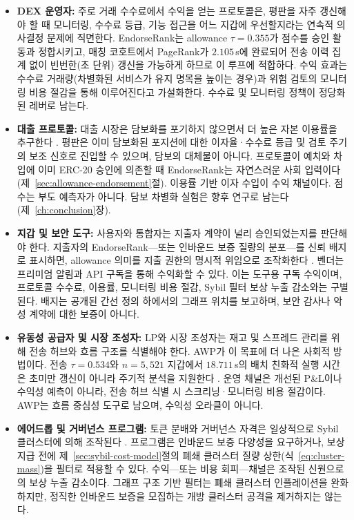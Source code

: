 \begin{itemize}
\item \textbf{DEX 운영자:} 주로 거래 수수료에서 수익을 얻는 프로토콜은, 평판을 자주 갱신해야 할 때 모니터링, 수수료 등급, 기능 접근을 어느 지갑에 우선할지라는 연속적 의사결정 문제에 직면한다. EndorseRank는 allowance $\tau=0.355$가 점수를 승인 활동과 정합시키고, 매칭 코호트에서 PageRank가 $2.105$\,s에 완료되어 전송 이력 집계 없이 빈번한(초 단위) 갱신을 가능하게 하므로 이 루프에 적합하다. 수익 효과는 수수료 거래량(차별화된 서비스가 유지 명목을 높이는 경우)과 위험 검토의 모니터링 비용 절감을 통해 이루어진다고 가설화한다. 수수료 및 모니터링 정책이 정당화된 레버로 남는다.

\item \textbf{대출 프로토콜:} 대출 시장은 담보화를 포기하지 않으면서 더 높은 자본 이용률을 추구한다 . 평판은 이미 담보화된 포지션에 대한 이자율·수수료 등급 및 검토 주기의 보조 신호로 진입할 수 있으며, 담보의 대체물이 아니다. 프로토콜이 예치와 차입에 이미 ERC-20 승인에 의존할 때 EndorseRank는 자연스러운 사회 입력이다(제~\ref{sec:allowance-endorsement}절). 이용률 기반 이자 수입이 수익 채널이다. 점수는 부도 예측자가 아니다. 담보 차별화 실험은 향후 연구로 남는다(제~\ref{ch:conclusion}장).

\item \textbf{지갑 및 보안 도구:} 사용자와 통합자는 지출자 계약이 널리 승인되었는지를 판단해야 한다. 지출자의 EndorseRank---또는 인바운드 보증 질량의 분포---를 신뢰 배지로 표시하면, allowance 의미를 지출 권한의 명시적 위임으로 조작화한다 . 벤더는 프리미엄 알림과 API 구독을 통해 수익화할 수 있다. 이는 도구용 구독 수익이며, 프로토콜 수수료, 이용률, 모니터링 비용 절감, Sybil 필터 보상 누출 감소와는 구별된다. 배지는 공개된 간선 정의 하에서의 그래프 위치를 보고하며, 보안 감사나 악성 계약에 대한 보증이 아니다.

\item \textbf{유동성 공급자 및 시장 조성자:} LP와 시장 조성자는 재고 및 스프레드 관리를 위해 전송 허브와 흐름 구조를 식별해야 한다. AWP가 이 목표에 더 나은 사회적 방법이다. 전송 $\tau=0.534$와 $n=5{,}521$ 지갑에서 $18.711$\,s의 배치 친화적 실행 시간은 초미만 갱신이 아니라 주기적 분석을 지원한다 . 운영 채널은 개선된 P\&L이나 수익성 예측이 아니라, 전송 허브 식별 시 스크리닝·모니터링 비용 절감이다. AWP는 흐름 중심성 도구로 남으며, 수익성 오라클이 아니다.

\item \textbf{에어드롭 및 거버넌스 프로그램:} 토큰 분배와 거버넌스 자격은 일상적으로 Sybil 클러스터에 의해 조작된다 . 프로그램은 인바운드 보증 다양성을 요구하거나, 보상 지급 전에 제~\ref{sec:sybil-cost-model}절의 폐쇄 클러스터 질량 상한(식~\ref{eq:cluster-mass})을 필터로 적용할 수 있다. 수익---또는 비용 회피---채널은 조작된 신원으로의 보상 누출 감소이다. 그래프 구조 기반 필터는 폐쇄 클러스터 인플레이션을 완화하지만, 정직한 인바운드 보증을 모집하는 개방 클러스터 공격을 제거하지는 않는다.


\end{itemize}
